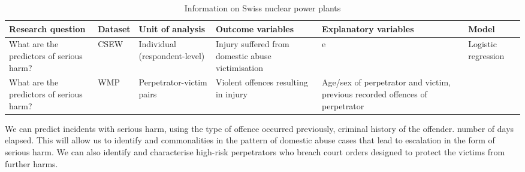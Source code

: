 \documentclass[11pt, a4paper]{article}
\begin{document}
\begin{table}[!htbp]
\caption{Information on Swiss nuclear power plants}
  \begin{threeparttable}[t]
  \centering
       \begin{tabular}{ L{2.8cm}  C{1.8cm}  C{1.8cm}  C{3.2cm}  C{2.8cm}  C{2cm} }
    \toprule
     \textbf{Research question} & \textbf{Dataset}    & \textbf{Unit of analysis} & \textbf{Outcome variables} & \textbf{Explanatory variables} & \textbf{Model} \\
    \midrule
    What are the predictors of serious harm? & CSEW & Individual (respondent-level) & Injury suffered from domestic abuse victimisation & e & Logistic regression \\
    What are the predictors of serious harm? & WMP & Perpetrator-victim pairs & Violent offences resulting in injury & Age/sex of perpetrator and victim, previous recorded offences of perpetrator &  \\
     \bottomrule
  \end{tabular}
    \end{threeparttable}%
  \label{tab:addlabel}%
\end{table}%

We can predict incidents with serious harm, using the type of offence occurred previously, criminal history of the offender. number of days elapsed. This will allow us to identify and commonalities in the pattern of domestic abuse cases that lead to escalation in the form of serious harm. We can also identify and characterise high-risk perpetrators who breach court orders designed to protect the victims from further harms.

\end{document}
